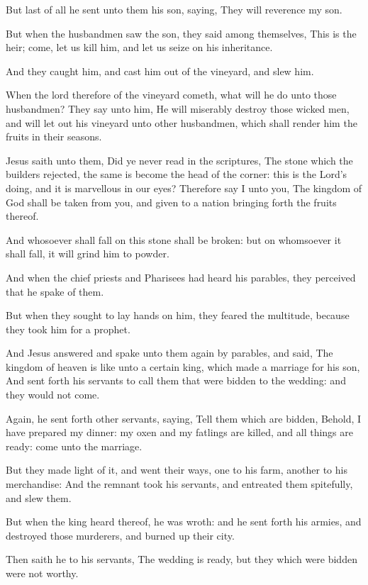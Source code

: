 \Verse But last of all he sent unto them his son, saying, They will reverence my son.

\Verse But when the husbandmen saw the son, they said among themselves, This is the heir; come, let us kill him, and let us seize on his inheritance.

\Verse And they caught him, and cast him out of the vineyard, and slew him.

\Verse When the lord therefore of the vineyard cometh, what will he do unto those husbandmen?  \Verse They say unto him, He will miserably destroy those wicked men, and will let out his vineyard unto other husbandmen, which shall render him the fruits in their seasons.

\Verse Jesus saith unto them, Did ye never read in the scriptures, The stone which the builders rejected, the same is become the head of the corner: this is the Lord's doing, and it is marvellous in our eyes?  \Verse Therefore say I unto you, The kingdom of God shall be taken from you, and given to a nation bringing forth the fruits thereof.

\Verse And whosoever shall fall on this stone shall be broken: but on whomsoever it shall fall, it will grind him to powder.

\Verse And when the chief priests and Pharisees had heard his parables, they perceived that he spake of them.

\Verse But when they sought to lay hands on him, they feared the multitude, because they took him for a prophet.


\Chapter
\Verse And Jesus answered and spake unto them again by parables, and said, \Verse The kingdom of heaven is like unto a certain king, which made a marriage for his son, \Verse And sent forth his servants to call them that were bidden to the wedding: and they would not come.

\Verse Again, he sent forth other servants, saying, Tell them which are bidden, Behold, I have prepared my dinner: my oxen and my fatlings are killed, and all things are ready: come unto the marriage.

\Verse But they made light of it, and went their ways, one to his farm, another to his merchandise: \Verse And the remnant took his servants, and entreated them spitefully, and slew them.

\Verse But when the king heard thereof, he was wroth: and he sent forth his armies, and destroyed those murderers, and burned up their city.

\Verse Then saith he to his servants, The wedding is ready, but they which were bidden were not worthy.

